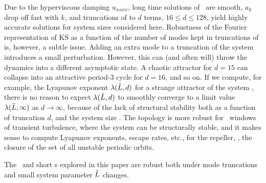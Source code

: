 Due to the hyperviscous damping $u_{xxxx}$, long time solutions of
\KSe\ are smooth, $a_k$ drop off fast with $k$,
and truncations of  to $d$ terms, $16 \leq d \leq 128$,
yield highly accurate solutions for system sizes considered here.
Robustness of the Fourier representation of KS as a function of the
number of modes kept in truncations of  is, however,
a subtle issue.  Adding an extra mode to a truncation of the system
introduces a small perturbation.
However, this can (and often will) throw the dynamics
into a different asymptotic state.
A chaotic attractor for $d=15$ can
collapse into an attractive period-3 cycle for $d=16$, and so on.
If
we compute, for example, the Lyapunov exponent $\lambda(\tilde{L},d)$ for
a strange attractor of the system , there is no reason to
expect $\lambda(\tilde{L},d)$ to smoothly converge to a limit value
$\lambda(\tilde{L},\infty)$ as $d \rightarrow \infty$, because of the lack
of structural stability both as a function of truncation $d$, and the
system size \tildeL.
The topology is more robust for \tildeL\ windows
of transient turbulence, where the system can be structurally stable,
and it makes sense to compute Lyapunov exponents, escape rates, etc.,
for the {repeller}, \ie, the closure of the set of all {unstable}
periodic orbits.

The \eqva\ and short \po s explored in this paper
are robust both under mode truncations and small
system parameter $\tilde{L}$ changes.


